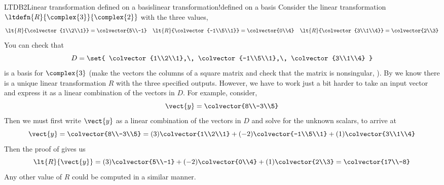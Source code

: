 \begin{example}{LTDB2}{Linear transformation defined on a basis}{linear transformation!defined on a basis}
Consider the linear transformation $\ltdefn{R}{\complex{3}}{\complex{2}}$ with the three values,
%
\begin{align*}
\lt{R}{\colvector{1\\2\\1}}=\colvector{5\\-1}&&
\lt{R}{\colvector{-1\\5\\1}}=\colvector{0\\4}&&
\lt{R}{\colvector{3\\1\\4}}=\colvector{2\\3}
\end{align*}
%
You can check that 
%
\begin{equation*}
D=\set{
\colvector{1\\2\\1},\,
\colvector{-1\\5\\1},\,
\colvector{3\\1\\4}
}
\end{equation*}
%
is a basis for $\complex{3}$ (make the vectors the columns of a square matrix and check that the matrix is nonsingular,  ).  By  we know there is a unique linear transformation $R$ with the three specified outputs.  However, we have to work just a bit harder to take an input vector and express it as a linear combination of the vectors in $D$.  For example, consider,
%
\begin{equation*}
\vect{y}=\colvector{8\\-3\\5}
\end{equation*}
%
Then we must first write $\vect{y}$ as a linear combination of the vectors in $D$ and solve for the unknown scalars, to arrive at
%
\begin{equation*}
\vect{y}=\colvector{8\\-3\\5}= (3)\colvector{1\\2\\1}+ (-2)\colvector{-1\\5\\1}+ (1)\colvector{3\\1\\4}
\end{equation*}
%
Then the proof of  gives us
%
\begin{equation*}
\lt{R}{\vect{y}}=(3)\colvector{5\\-1}+ (-2)\colvector{0\\4}+ (1)\colvector{2\\3}= \colvector{17\\-8}
\end{equation*}
%
Any other value of $R$ could be computed in a similar manner.
%
\end{example}
